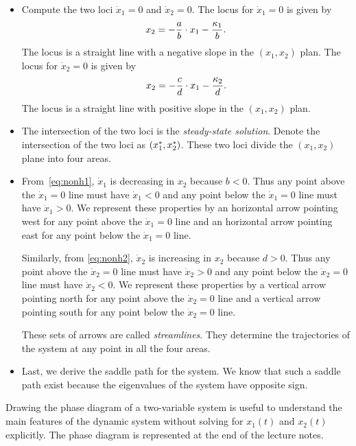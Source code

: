 \documentclass[letterpaper,12pt,leqno]{article}
\begin{document}
\begin{itemize}

\item Compute the two loci $\dot{x}_{1}=0$ and $\dot{x}_{2}=0$. The locus for $\dot{x}_{1}=0$ is given by
\begin{align*}
x_{2}=-\frac{a}{b}\cdot x_{1}-\frac{\kappa_{1}}{b}.
\end{align*}
The locus is a straight line with a negative slope in the $(x_{1},x_{2})$ plan. The locus  for $\dot{x}_{2}=0$ is given by
\begin{align*}
x_{2}=-\frac{c}{d}\cdot x_{1}-\frac{\kappa_{2}}{d}.
\end{align*}
The locus is a straight line with positive slope in the $(x_{1},x_{2})$ plan.

\item The intersection of the two loci is the \textit{steady-state solution}. Denote the intersection of the two loci as $\left( x_{1}^{*},x_{2}^{*} \right) $. These two loci divide the $(x_{1},x_{2})$ plane into four areas.

\item From~\eqref{eq:nonh1}, $\dot{x}_{1}$ is decreasing in $x_{2}$ because $b<0$. Thus any point above the $\dot{x}_{1}=0$ line must have $\dot{x}_{1}<0$ and any point below the $\dot{x}_{1}=0$ line must have $\dot{x}_{1}>0$. We represent these properties by an horizontal arrow pointing west for any point above the $\dot{x}_{1}=0$ line and an horizontal arrow pointing east for any point below the $\dot{x}_{1}=0$ line. 

Similarly, from \eqref{eq:nonh2}, $\dot{x}_{2}$ is increasing in $x_{2}$ because $d>0$. Thus any point above the $\dot{x}_{2}=0$ line must have $\dot{x}_{2}>0$ and any point below the $\dot{x}_{2}=0$ line must have $\dot{x}_{2}<0$. We represent these properties by a vertical arrow pointing north for any point above the $\dot{x}_{2}=0$ line and a vertical arrow pointing south for any point below the $\dot{x}_{2}=0$ line. 

These sets of arrows are called \textit{streamlines}. They determine the trajectories of the system at any point in all the
four areas. 

\item Last, we derive the saddle path for the system. We know that such a saddle path exist because the eigenvalues of the system have opposite sign. 

\end{itemize}

Drawing the phase diagram of a two-variable system is useful to understand the main features of the dynamic system without solving for $x_{1}(t) $ and $x_{2}(t) $ explicitly. The phase diagram is represented at the end of the lecture notes.
\end{document}
